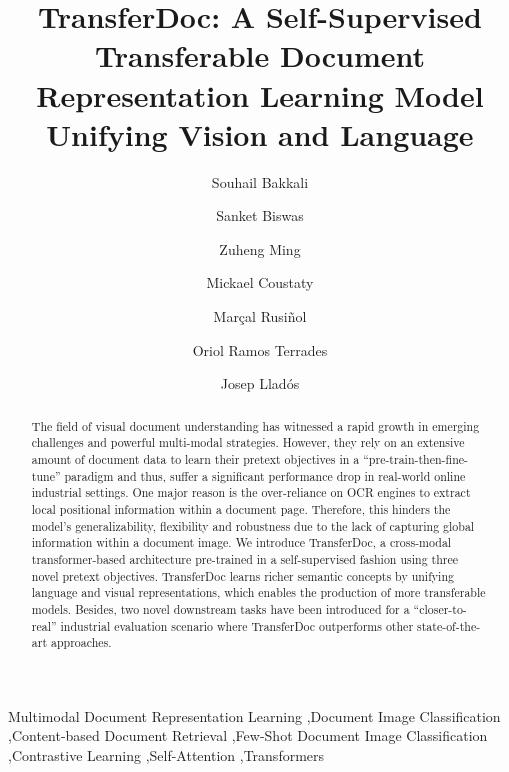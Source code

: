 \documentclass[preprint,review,12pt]{elsarticle}
\begin{document}
\begin{frontmatter}

\title{TransferDoc: A Self-Supervised Transferable Document Representation Learning Model Unifying Vision and Language}

\author[inst1]{Souhail Bakkali}
\author[inst4]{Sanket Biswas}
\author[inst2]{Zuheng Ming}
\author[inst1]{Mickael Coustaty}
\author[inst3]{Marçal Rusiñol}
\author[inst4]{Oriol Ramos Terrades}
\author[inst4]{Josep Lladós}

\begin{abstract}
The field of visual document understanding has witnessed a rapid growth in emerging challenges and powerful multi-modal strategies. However, they rely on an extensive amount of document data to learn their pretext objectives in a ``pre-train-then-fine-tune'' paradigm and thus, suffer a significant performance drop in real-world online industrial settings. One major reason is the over-reliance on OCR engines to extract local positional information within a document page. Therefore, this hinders the model's generalizability, flexibility and robustness due to the lack of capturing global information within a document image. We introduce TransferDoc, a cross-modal transformer-based architecture pre-trained in a self-supervised fashion using three novel pretext objectives. TransferDoc learns richer semantic concepts by unifying language and visual representations, which enables the production of more transferable models. Besides, two novel downstream tasks have been introduced for a ``closer-to-real'' industrial evaluation scenario where TransferDoc outperforms other state-of-the-art approaches.
\end{abstract}

\begin{keyword}

Multimodal Document Representation Learning \sep Document Image Classification \sep Content-based Document Retrieval \sep Few-Shot Document Image Classification \sep Contrastive Learning \sep Self-Attention \sep Transformers

\end{keyword}

\end{frontmatter}
\end{document}
